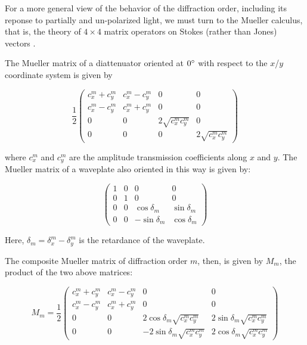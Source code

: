 \documentclass[footinbib,aps,prl,superscriptaddress]{revtex4-1}
\begin{document}
For a more general view of the behavior of the diffraction order, including its reponse to partially and un-polarized light, we must turn to the Mueller calculus, that is, the theory of $4\times4$ matrix operators on Stokes (rather than Jones) vectors \cite{Damask2005, Shurcliff1962}.

The Mueller matrix of a diattenuator oriented at $0\degree$ with respect to the $x$/$y$ coordinate system is given by

\begin{equation}
	\frac{1}{2}
	\begin{pmatrix}
	c_x^m + c_y^m & c_x^m - c_y^m & 0 & 0 \\
	c_x^m - c_y^m & c_x^m +c_y^m & 0 & 0 \\
	0 & 0 & 2\sqrt{c_x^m c_y^m} & 0 \\
	0 & 0 & 0 & 2\sqrt{c_x^m c_y^m}
	\end{pmatrix}
\end{equation}

where $c_x^m$ and $c_y^m$ are the amplitude transmission coefficients along $x$ and $y$. The Mueller matrix of a waveplate also oriented in this way is given by:

\begin{equation}
	\begin{pmatrix}
	1 & 0 & 0 & 0 \\	
	0 & 1 & 0 & 0 \\
	0 & 0 & \cos\delta_m & \sin\delta_m \\
	0 & 0 & -\sin\delta_m & \cos\delta_m
	\end{pmatrix}
\end{equation}

Here, $\delta_m = \delta_x^m - \delta_y^m$ is the retardance of the waveplate. 

The composite Mueller matrix of diffraction order $m$, then, is given by $M_m$, the product of the two above matrices:

\begin{equation}
	M_m =
	\frac{1}{2}
	\begin{pmatrix}
	c_x^m + c_y^m & c_x^m - c_y^m & 0 & 0 \\
	c_x^m - c_y^m & c_x^m +c_y^m & 0 & 0 \\
	0 & 0 & 2\cos\delta_m \sqrt{c_x^m c_y^m} & 2\sin\delta_m \sqrt{c_x^m c_y^m} \\
	0 & 0 & -2\sin\delta_m \sqrt{c_x^m c_y^m} & 2\cos\delta_m \sqrt{c_x^m c_y^m}
	\end{pmatrix}
\end{equation}
\end{document}
